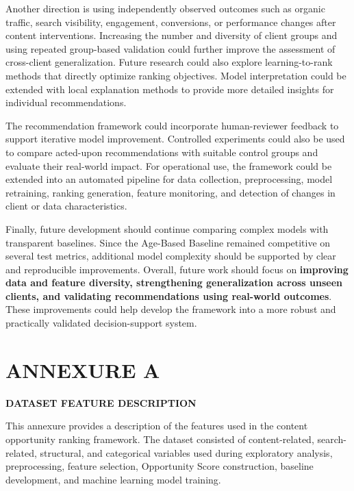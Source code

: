 \documentclass[12pt,a4paper]{report}
\begin{document}
Another direction is using independently observed outcomes such as organic traffic, search visibility, engagement, conversions, or performance changes after content interventions. Increasing the number and diversity of client groups and using repeated group-based validation could further improve the assessment of cross-client generalization. Future research could also explore learning-to-rank methods that directly optimize ranking objectives. Model interpretation could be extended with local explanation methods to provide more detailed insights for individual recommendations.

The recommendation framework could incorporate human-reviewer feedback to support iterative model improvement. Controlled experiments could also be used to compare acted-upon recommendations with suitable control groups and evaluate their real-world impact. For operational use, the framework could be extended into an automated pipeline for data collection, preprocessing, model retraining, ranking generation, feature monitoring, and detection of changes in client or data characteristics.

Finally, future development should continue comparing complex models with transparent baselines. Since the Age-Based Baseline remained competitive on several test metrics, additional model complexity should be supported by clear and reproducible improvements. Overall, future work should focus on \textbf{improving data and feature diversity, strengthening generalization across unseen clients, and validating recommendations using real-world outcomes}. These improvements could help develop the framework into a more robust and practically validated decision-support system.
%
\appendix
\chapter*{ANNEXURE A}


\begin{center}
    \textbf{\Large DATASET FEATURE DESCRIPTION}
\end{center}

\vspace{0.5cm}

This annexure provides a description of the features used in the content opportunity ranking framework. The dataset consisted of content-related, search-related, structural, and categorical variables used during exploratory analysis, preprocessing, feature selection, Opportunity Score construction, baseline development, and machine learning model training.
\end{document}
